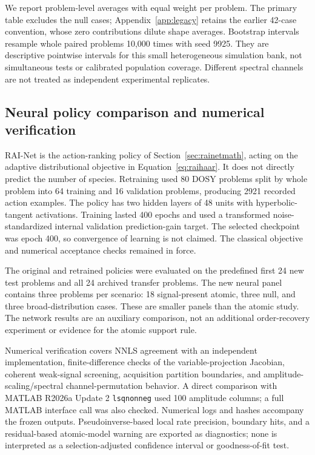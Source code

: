 We report problem-level averages with equal weight per problem. The primary table excludes the null cases; Appendix~\ref{app:legacy} retains the earlier 42-case convention, whose zero contributions dilute shape averages. Bootstrap intervals resample whole paired problems 10,000 times with seed 9925. They are descriptive pointwise intervals for this small heterogeneous simulation bank, not simultaneous tests or calibrated population coverage. Different spectral channels are not treated as independent experimental replicates.

\subsection{Neural policy comparison and numerical verification}
RAI-Net is the action-ranking policy of Section~\ref{sec:rainetmath}, acting on the adaptive distributional objective in Equation~\eqref{eq:raihaar}. It does not directly predict the number of species. Retraining used 80 DOSY problems split by whole problem into 64 training and 16 validation problems, producing 2921 recorded action examples. The policy has two hidden layers of 48 units with hyperbolic-tangent activations. Training lasted 400 epochs and used a transformed noise-standardized internal validation prediction-gain target. The selected checkpoint was epoch 400, so convergence of learning is not claimed. The classical objective and numerical acceptance checks remained in force.

The original and retrained policies were evaluated on the predefined first 24 new test problems and all 24 archived transfer problems. The new neural panel contains three problems per scenario: 18 signal-present atomic, three null, and three broad-distribution cases. These are smaller panels than the atomic study. The network results are an auxiliary comparison, not an additional order-recovery experiment or evidence for the atomic support rule.

Numerical verification covers NNLS agreement with an independent implementation, finite-difference checks of the variable-projection Jacobian, coherent weak-signal screening, acquisition partition boundaries, and amplitude-scaling/spectral channel-permutation behavior. A direct comparison with MATLAB R2026a Update 2 \texttt{lsqnonneg} used 100 amplitude columns; a full MATLAB interface call was also checked. Numerical logs and hashes accompany the frozen outputs. Pseudoinverse-based local rate precision, boundary hits, and a residual-based atomic-model warning are exported as diagnostics; none is interpreted as a selection-adjusted confidence interval or goodness-of-fit test.

